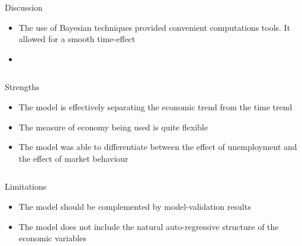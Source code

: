 \documentclass[final]{beamer}
\newcounter{acolumn}%
\def\autoheight{\vspace*{0pt}}%
\begin{document}
\begin{frame}
\begin{acolumns}[t]
        \begin{column}{.24\linewidth}
        		
                 
                 \begin{block}{Discussion}
                 	\begin{itemize}
                 		\item The use of Bayesian techniques provided convenient computations tools. It allowed for a smooth time-effect
                 		\item                  		
                 	\end{itemize}
                  \autoheight   
                 \end{block}
                              
        \end{column}
        
        \begin{column}{.24\linewidth}
		
         
         \begin{block}{Strengths}
         	\begin{itemize}
         		\item The model is effectively separating the economic trend from the time trend
         		\item The measure of economy being used is quite flexible
         		\item The model was able to differentiate between the effect of unemployment and the effect of market behaviour
         	\end{itemize}
          \autoheight   
         \end{block}
                      
        \end{column}
                  
        
        \begin{column}{.24\linewidth}
         
         \begin{block}{Limitations}
         	\begin{itemize}
         		\item The model should be complemented by model-validation results
         		\item The model does not include the natural auto-regressive structure of the economic variables
         	\end{itemize}
          \autoheight   
         \end{block}
                      

\end{column}
\end{acolumns}
\end{frame}
\end{document}
